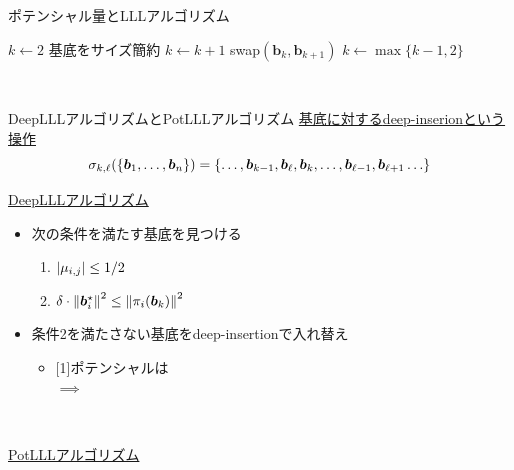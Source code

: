\documentclass[12pt,aspectratio=169,xcolor=dvipsnames,table,dvipdfmx, leqno]{beamer}
\begin{document}
\begin{frame}{ポテンシャル量とLLLアルゴリズム}
\begin{minipage}[b]{0.45\columnwidth}
\begin{algorithm}[H]
\begin{algorithmic}[1]
            \State $k \gets 2$
                \State 基底をサイズ簡約\cite{Hermite1850}
                    \State $k\gets k+1$
                \Else
                    \State swap$(\bm{b}_k, \bm{b}_{k+1})$
                    \State $k\gets\max\{k-1, 2\}$
                \EndIf
            \EndWhile
        \end{algorithmic}
    \end{algorithm}
    \mbox{}\\
\end{minipage}
\end{frame}

\begin{frame}{DeepLLLアルゴリズムとPotLLLアルゴリズム}
\uline{基底に対する\alert{deep-inserion}という操作}
\[
\sigma_{k, \ell}(\qty{\bm{b}_1,\ldots,\bm{b}_n})=\{\ldots, \bm{b}_{k - 1}, \bm{b}_\ell, \bm{b}_{k}, \ldots, \bm{b}_{\ell-1}, \bm{b}_{\ell+1}\ldots\}
\]
\begin{minipage}[b]{0.45\columnwidth}
    \uline{DeepLLLアルゴリズム}\cite{SE94}
    \begin{itemize}
        \item 次の条件を満たす基底を見つける
        \begin{enumerate}
            \item $\abs{\mu_{i, j}}\le 1/2$
            \item $\delta\cdot \norm{\bm{b}_i^\star}^2\le\norm{\pi_{i}(\bm{b}_k)}^2$ 
        \end{enumerate}
        \item 条件2を満たさない基底をdeep-insertionで入れ替え
        \begin{itemize}
            \item \scalebox{0.9}[1]{ポテンシャルは}\\
            $\implies$ 
        \end{itemize}
    \end{itemize}
    \mbox{}\\
\end{minipage}
\begin{minipage}[b]{0.45\columnwidth}
    \uline{PotLLLアルゴリズム}\cite{FSW14}
    \begin{itemize}

\end{itemize}
\end{minipage}
\end{frame}
\end{document}
